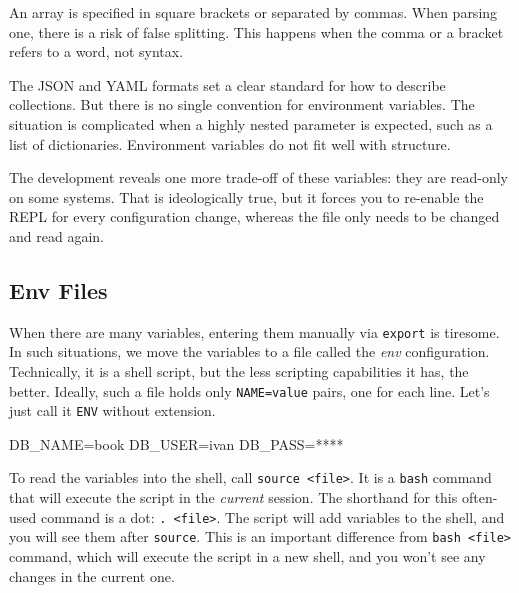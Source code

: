 \fi


An array is specified in square brackets or separated by commas. When parsing one, there is a risk of false splitting. This happens when the comma or a bracket refers to a word, not syntax.


The JSON and YAML formats set a clear standard for how to describe collections. But there is no single convention for environment variables. The situation is complicated when a highly nested parameter is expected, such as a list of dictionaries. Environment variables do not fit well with structure.

The development reveals one more trade-off of these variables: they are read-only on some systems. That is ideologically true, but it forces you to re-enable the REPL for every configuration change, whereas the file only needs to be changed and read again.

\subsection{Env Files}


When there are many variables, entering them manually via \verb|export| is tiresome. In such situations, we move the variables to a file called the \emph{env} configuration. Technically, it is a shell script, but the less scripting capabilities it has, the better. Ideally, such a file holds only \verb|NAME=value| pairs, one for each line. Let's just call it \verb|ENV| without extension.

\begin{bash}
DB_NAME=book
DB_USER=ivan
DB_PASS=****
\end{bash}

To read the variables into the shell, call \verb|source <file>|. It is a \verb|bash| command that will execute the script in the \emph{current} session. The shorthand for this often-used command is a dot: \verb|. <file>|. The script will add variables to the shell, and you will see them after \verb|source|. This is an important difference from \verb|bash <file>| command, which will execute the script in a new shell, and you won't see any changes in the current one.


